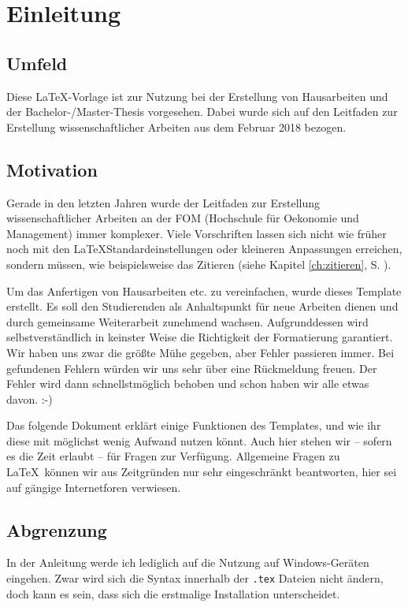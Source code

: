 
\chapter{Einleitung}\label{ch:einleitung}

\section{Umfeld}

Diese \LaTeX -Vorlage ist zur Nutzung bei der Erstellung von Hausarbeiten und der Bachelor-/Master-Thesis vorgesehen. 
Dabei wurde sich auf den Leitfaden zur Erstellung wissenschaftlicher Arbeiten aus dem Februar 2018 bezogen.

\section{Motivation}

Gerade in den letzten Jahren wurde der Leitfaden zur Erstellung wissenschaftlicher Arbeiten an der FOM (Hochschule für Oekonomie und Management) immer komplexer. 
Viele Vorschriften lassen sich nicht wie früher noch mit den \LaTeX\-Standardeinstellungen oder kleineren Anpassungen erreichen, sondern müssen, wie beispielsweise das Zitieren (siehe Kapitel \ref{ch:zitieren}, S. \pageref{ch:zitieren}).

Um das Anfertigen von Hausarbeiten etc. zu vereinfachen, wurde dieses Template erstellt. 
Es soll den Studierenden als Anhaltspunkt für neue Arbeiten dienen und durch gemeinsame Weiterarbeit zunehmend wachsen.
Aufgrunddessen wird selbstverständlich in keinster Weise die Richtigkeit der Formatierung garantiert. 
Wir haben uns zwar die größte Mühe gegeben, aber Fehler passieren immer. 
Bei gefundenen Fehlern würden wir uns sehr über eine Rückmeldung freuen. 
Der Fehler wird dann schnellstmöglich behoben und schon haben wir alle etwas davon. :-)

Das folgende Dokument erklärt einige Funktionen des Templates, und wie ihr diese mit möglichst wenig Aufwand nutzen könnt. Auch hier stehen wir -- sofern es die Zeit erlaubt -- für Fragen zur Verfügung. Allgemeine Fragen zu \LaTeX\ können wir aus Zeitgründen nur sehr eingeschränkt beantworten, hier sei auf gängige Internetforen verwiesen.

\section{Abgrenzung}
In der Anleitung werde ich lediglich auf die Nutzung auf Windows-Geräten eingehen. 
Zwar wird sich die Syntax innerhalb der \texttt{.tex} Dateien nicht ändern, doch kann es sein, dass sich die erstmalige Installation unterscheidet.